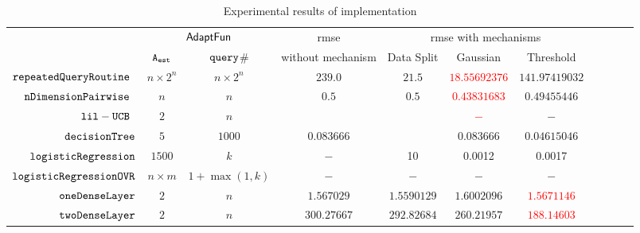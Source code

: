 {\footnotesize
\begin {table}[H]
\vspace{-0.4cm}
    \caption{Experimental results of {\THESYSTEM} implementation}
    \vspace{-0.5cm}
        \label{tb:adapt-imp}
        \begin{center}
        \centering
{\tiny
        \begin{tabular}{| >{\tiny}r | c | c | c | c | c | c | c | c | c | c  }
         \hline \hline
        \multirow{2}{*}{Program $c$}
         & \multicolumn{2}{c|}{$\textsf{AdaptFun}$}
         & {rmse}
         & \multicolumn{3}{c|}{rmse with mechanisms} \\ 
         \cline{2-3} \cline{5-7}
         & {${\mathtt{A_{est}}}$ } & {${\tt query}$\# } &  without mechanism & Data Split & Gaussian & Threshold  \\ 
         \cline{6-7}
         \hline \hline
         $  \mathtt{repeatedQueryRoutine}$~\cite{Jamieson2015TheAO} & $ n \times 2^n $ & $  n \times 2^n $ & $239.0$   & $21.5$ & \textcolor{red}{$18.55692376$} & $141.97419032$  \\
         $  \mathtt{nDimensionPairwise}$~\cite{Jamieson2015TheAO} & $ n $ & $  n  $ & $0.5$   & $0.5$ & \textcolor{red}{$ 0.43831683 $} & $ 0.49455446 $  \\
         $  \mathtt{lil-UCB}$~\cite{Jamieson2015TheAO} & $ 2 $ & $  n $ & $ $   & $ $ & \textcolor{red}{$-$} & $-$  \\
         $  \mathtt{decisionTree}$ & $5$ &  $1000$ & $0.083666$  & $  $ & $0.083666$ &$0.04615046$  \\
         $  \mathtt{logisticRegression}$ & $1500$ &  $k$ & $-$  &  10 & 0.0012 & 0.0017   \\
         $  \mathtt{logisticRegressionOVR}$    & $n\times m$ &  $1+ \max(1, k) $ &  $ -  $  &  $-$ & $-$ & $-$ \\
         $  \mathtt{oneDenseLayer}$ & $2$   & $ n $   &  $ 1.567029  $  &  {$ 1.5590129 $} & $1.6002096$ & \textcolor{red}{$ 1.5671146 $}  \\
         {$ \mathtt{twoDenseLayer}$} & $2$ &  $ n $ &  $ 300.27667 $  &  $ 292.82684 $ & $ 260.21957 $ & \textcolor{red}{$ 188.14603 $}  \\

\end{tabular}}
\end{center}
\end{table}}
